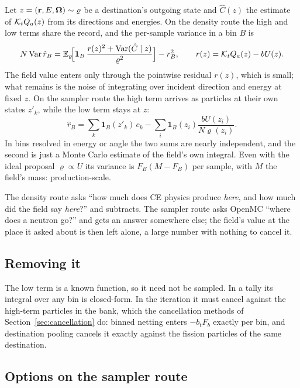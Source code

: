 Let $z=(\mathbf r,E,\boldsymbol\Omega)\sim\varrho$ be a destination's outgoing state and $\hat C(z)$ the estimate of
$\mathcal K_tQ_a(z)$ from its directions and energies. On the density route the high and low terms share
the record, and the per-sample variance in a bin $B$ is
\begin{equation}
N\operatorname{Var}\hat r_B=\mathbb E_\varrho\!\Big[\mathbf 1_B\,\frac{r(z)^2+\operatorname{Var}(\hat C\mid z)}{\varrho^2}\Big]-r_B^2,
\qquad r(z)=\mathcal K_tQ_a(z)-bU(z).
\end{equation}
The field value enters only through the pointwise residual $r(z)$, which is small; what remains is
the noise of integrating over incident direction and energy at fixed $z$. On the sampler route the
high term arrives as particles at their own states $z'_k$, while the low term stays at $z$:
\begin{equation}
\hat r_B=\sum_k\mathbf 1_B(z'_k)\,c_k-\sum_i\mathbf 1_B(z_i)\frac{bU(z_i)}{N\varrho(z_i)}.
\end{equation}
In bins resolved in energy or angle the two sums are nearly independent, and the second is just a
Monte Carlo estimate of the field's own integral. Even with the ideal proposal $\varrho\propto U$ its
variance is $F_B(M-F_B)$ per sample, with $M$ the field's mass: production-scale.

\begin{intuition}
The density route asks ``how much does CE physics produce \emph{here}, and how much did the field say
\emph{here}?'' and subtracts. The sampler route asks OpenMC ``where does a neutron go?'' and gets an
answer somewhere else; the field's value at the place it asked about is then left alone, a large
number with nothing to cancel it.
\end{intuition}

\subsection{Removing it}

The low term is a known function, so it need not be sampled. In a tally its integral over any bin is
closed-form. In the iteration it must cancel against the high-term particles in the bank, which the
cancellation methods of Section~\ref{sec:cancellation} do: binned netting enters $-b_tF_b$ exactly per
bin, and destination pooling cancels it exactly against the fission particles of the same destination.

\subsection{Options on the sampler route}

